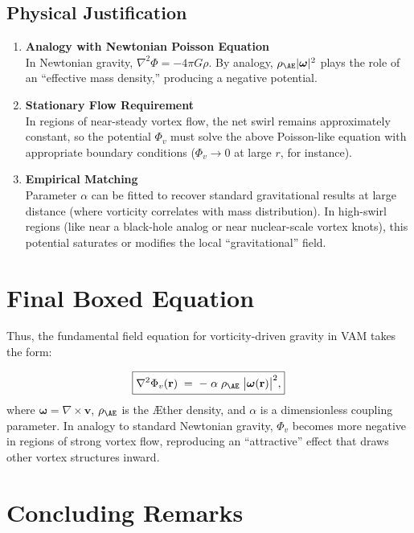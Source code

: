 \subsection{Physical Justification}
\begin{enumerate}
    \item \textbf{Analogy with Newtonian Poisson Equation} \\
    In Newtonian gravity, \(\nabla^2 \Phi = -4\pi G\rho\). By analogy, \(\rho_{\mathrm{\AE}}|\boldsymbol{\omega}|^2\) plays the role of an “effective mass density,” producing a negative potential.
    \item \textbf{Stationary Flow Requirement} \\
    In regions of near-steady vortex flow, the net swirl remains approximately constant, so the potential \(\Phi_v\) must solve the above Poisson-like equation with appropriate boundary conditions (\(\Phi_v \to 0\) at large \(r\), for instance).
    \item \textbf{Empirical Matching} \\
    Parameter \(\alpha\) can be fitted to recover standard gravitational results at large distance (where vorticity correlates with mass distribution). In high-swirl regions (like near a black-hole analog or near nuclear-scale vortex knots), this potential saturates or modifies the local “gravitational” field.
\end{enumerate}

\section{Final Boxed Equation}

Thus, the fundamental field equation for vorticity-driven gravity in VAM takes the form:

\[
    \boxed{
        \nabla^2 \Phi_v(\mathbf{r})
        \;=\;
        -\;\alpha\;\rho_{\mathrm{\AE}}\;\bigl|\boldsymbol{\omega}(\mathbf{r})\bigr|^2,
    }
\]
where \(\boldsymbol{\omega} = \nabla \times \mathbf{v}\), \(\rho_{\mathrm{\AE}}\) is the Æther density, and \(\alpha\) is a dimensionless coupling parameter. In analogy to standard Newtonian gravity, \(\Phi_v\) becomes more negative in regions of strong vortex flow, reproducing an “attractive” effect that draws other vortex structures inward.

\section{Concluding Remarks}

